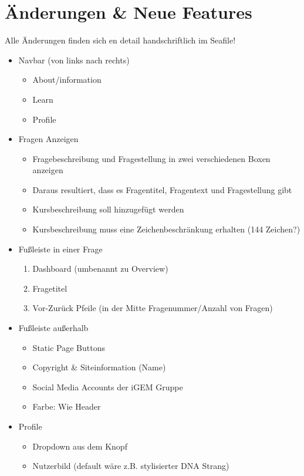 \documentclass[colorback, accentcolor=tud1c, paper=a4]{tudexercise}
\begin{document}
\section*{Änderungen \& Neue Features}
\begin{multicols}{2}

Alle Änderungen finden sich en detail handschriftlich im Seafile!
\begin{itemize}
	\item Navbar (von links nach rechts)
	\begin{itemize}
		\item About/information
		\item Learn
		\item Profile
	\end{itemize}
	\item Fragen Anzeigen
	\begin{itemize}
		\item Fragebeschreibung und Fragestellung in zwei verschiedenen Boxen anzeigen
		\item Daraus resultiert, dass es Fragentitel, Fragentext und Fragestellung gibt
		\item Kursbeschreibung soll hinzugefügt werden
		\item Kursbeschreibung muss eine Zeichenbeschränkung erhalten (144 Zeichen?)
	\end{itemize}
	\item Fußleiste in einer Frage
	\begin{enumerate}
		\item Dashboard (umbenannt zu Overview)
		\item Fragetitel
		\item Vor-Zurück Pfeile (in der Mitte Fragenummer/Anzahl von Fragen)
	\end{enumerate}
	\item Fußleiste außerhalb
	\begin{itemize}
		\item Static Page Buttons
		\item Copyright \& Siteinformation (Name)
		\item Social Media Accounts der iGEM Gruppe
		\item Farbe: Wie Header
	\end{itemize}
	\item Profile
	\begin{itemize}
		\item Dropdown aus dem Knopf 
		\item Nutzerbild (default wäre z.B. stylisierter DNA Strang)

\end{itemize}
\end{itemize}
\end{multicols}
\end{document}
